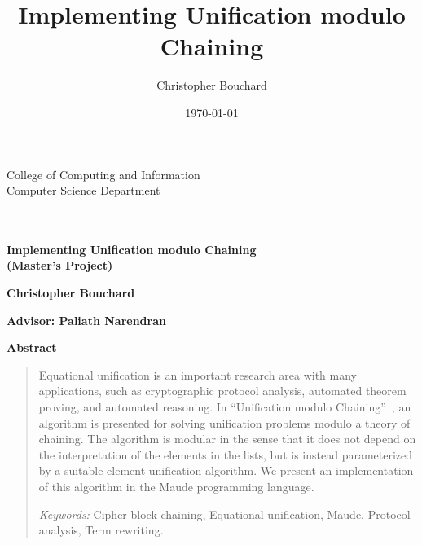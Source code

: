 \documentclass[11pt,twoside,titlepage]{article}
\title{Implementing Unification modulo Chaining}
\author{Christopher Bouchard}
\date{\today}
\begin{document}
\begin{titlepage}
    {\vspace*{-1in}\hspace*{-.5in}
    \parbox{7.25in}{
    \setlength{\baselineskip}{13pt}
    \makebox{\ } \hfill {\footnotesize College of Computing and Information} \\
    \makebox{\ } \hfill {\footnotesize Computer Science Department} \\
    \makebox{\ } \\
    \\
    }
    \vspace{-.95in}}

    \epsfxsize=3.15in
    \epsfclipon

    \vspace*{2in}

    \begin{center}
        \textbf{\huge Implementing Unification modulo Chaining} \\[+15pt]
        \textbf{(Master's Project)}
        \par
    \end{center}

    \vspace{2in}

    \begin{center}
    \textbf{\large Christopher Bouchard}\\

    \par\end{center}{\large \par}

    \begin{center}
    \textbf{\large \vspace{0.5in}
    Advisor: Paliath Narendran }\textbf{ }
    \par\end{center}
\end{titlepage}

\thispagestyle{empty}
\cleardoublepage

\begin{center}
    \textbf{Abstract}
\end{center}
\begin{quotation}
Equational unification is an important research area with many applications,
such as cryptographic protocol analysis, automated theorem proving, and
automated reasoning. In ``Unification modulo
Chaining''~\cite{anantharaman2012unification}, an algorithm is presented for
solving unification problems modulo a theory of chaining. The algorithm is
modular in the sense that it does not depend on the interpretation of the
elements in the lists, but is instead parameterized by a suitable element
unification algorithm. We present an implementation of this algorithm in the
Maude programming language.

\medskip{}
\textit{Keywords:} Cipher block chaining, Equational unification, Maude, Protocol
analysis, Term rewriting.
\end{quotation}
\end{document}
